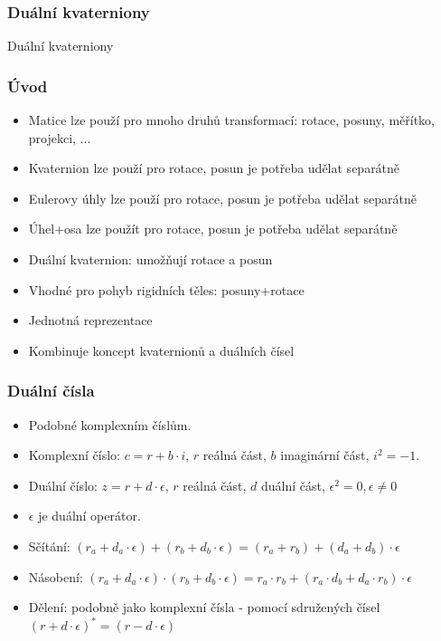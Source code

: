 \begin{frame}
\frametitle{Duální kvaterniony}
\begin{center}
\Huge {\color{white} Duální kvaterniony}
\end{center}
\end{frame}


\begin{frame}
\frametitle{Úvod}
	\begin{itemize}
	\item Matice lze použí pro mnoho druhů transformací: rotace, posuny, měřítko, projekci, ...
  \item Kvaternion lze použí pro rotace, posun je potřeba udělat separátně
  \item Eulerovy úhly lze použí pro rotace, posun je potřeba udělat separátně
  \item Úhel+osa lze použít pro rotace, posun je potřeba udělat separátně
  \item Duální kvaternion: umožňují rotace a posun
  \item Vhodné pro pohyb rigidních těles: posuny+rotace
  \item Jednotná reprezentace
  \item Kombinuje koncept kvaternionů a duálních čísel
	\end{itemize}
\end{frame}

\begin{frame}
\frametitle{Duální čísla}
	\begin{itemize}
	\item Podobné komplexním číslům.
  \item Komplexní číslo: $c = r+b \cdot i$, $r$ reálná část, $b$ imaginární část, $i^2 = -1$.
  \item Duální číslo: $z = r + d \cdot \epsilon$, $r$ reálná část, $d$ duální část, $\epsilon^2 = 0, \epsilon \neq 0$
  \item $\epsilon$ je duální operátor.
  \item Sčítání: $(r_a + d_a \cdot \epsilon) + (r_b + d_b \cdot \epsilon) = (r_a + r_b) + (d_a + d_b) \cdot \epsilon$
  \item Násobení: $(r_a + d_a \cdot \epsilon) \cdot (r_b + d_b \cdot \epsilon) = r_a \cdot r_b + (r_a \cdot d_b + d_a \cdot r_b) \cdot \epsilon $
  \item Dělení: podobně jako komplexní čísla - pomocí sdružených čísel $(r + d \cdot \epsilon)^* = (r - d \cdot \epsilon)$
	\end{itemize}
\end{frame}

